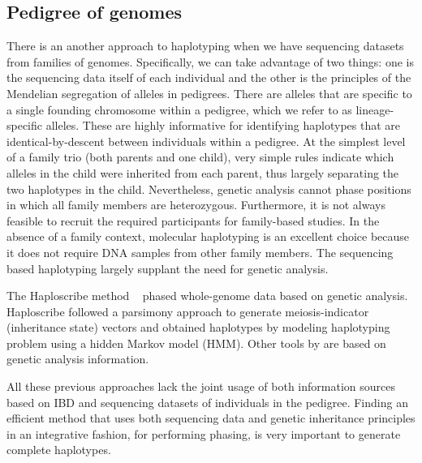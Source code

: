 \subsection{Pedigree of genomes}
There is an another approach to haplotyping when we have sequencing datasets from families of genomes.
Specifically, we can take advantage of two things: one is the sequencing data itself of each individual and the other is the principles of the Mendelian segregation of alleles in pedigrees. 
There are alleles that are specific to a single founding chromosome within a pedigree, which we refer to as lineage-specific alleles. These are highly informative for identifying haplotypes that are identical-by-descent between individuals within a pedigree.
At the simplest level of a family trio (both parents and one child), very simple rules indicate which alleles in the child were inherited from each parent, thus largely separating the two haplotypes in the child.  
Nevertheless, genetic analysis cannot phase positions in which all family members are heterozygous. 
Furthermore, it is not always feasible to recruit the required participants for family-based studies. 
In the absence of a family context, molecular haplotyping is an excellent choice because it does not require DNA samples from other family members. 
The sequencing based haplotyping largely supplant the need for genetic analysis.

The Haploscribe method ~\citep{Roach2011} phased whole-genome data based on genetic analysis. Haploscribe followed a parsimony approach to generate
meiosis-indicator (inheritance state) vectors and obtained haplotypes by modeling haplotyping problem using a hidden Markov model (HMM). 
Other tools by \cite{abecasis2002merlin, williams2010rapid} are based on genetic analysis information. 

All these previous approaches lack the joint usage of both information sources based on IBD and sequencing datasets of individuals in the pedigree. 
Finding an efficient method that uses both sequencing data and genetic inheritance principles in an integrative fashion, for performing phasing, is very important to generate complete haplotypes.


